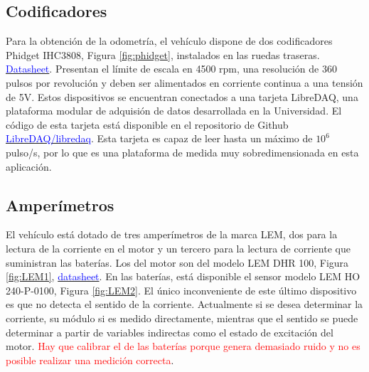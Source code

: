 \subsection{Codificadores}\label{Subsec:Codificadores}
Para la obtención de la odometría, el vehículo dispone de dos codificadores Phidget IHC3808, Figura \ref{fig:phidget}, instalados en las ruedas traseras. \href{https://github.com/ual-arm/ual-ecar-docs/blob/master/Datasheet/Encoder-Phidget-IHC3808.pdf}{\textcolor{blue}{Datasheet}}. Presentan el límite de escala en 4500 rpm, una resolución de 360 pulsos por revolución y deben ser alimentados en corriente continua a una tensión de 5V. Estos dispositivos se encuentran conectados a una tarjeta LibreDAQ, una plataforma modular de adquisión de datos desarrollada en la Universidad\cite{blanco2015LibreDaq}. El código de esta tarjeta está disponible en el repositorio de Github \href{https://github.com/LibreDAQ/libredaq}{\textcolor{blue}{LibreDAQ/libredaq}}. Esta tarjeta es capaz de leer hasta un máximo de $10^{6}$ pulso/s, por lo que es una plataforma de medida muy sobredimensionada en esta aplicación.

\subsection{Amperímetros}
El vehículo está dotado de tres amperímetros de la marca LEM, dos para la lectura de la corriente en el motor y un tercero para la lectura de corriente que suministran las baterías. Los del motor son del modelo LEM DHR 100, Figura \ref{fig:LEM1}, \href{https://github.com/ual-arm/ual-ecar-docs/blob/master/Datasheet/LEM_DHR_100.pdf}{\textcolor{blue}{datasheet}}. En las baterías, está disponible el sensor modelo LEM HO 240-P-0100, Figura \ref{fig:LEM2}. El único inconveniente de este último dispositivo es que no detecta el sentido de la corriente. Actualmente si se desea determinar la corriente, su módulo si es medido directamente, mientras que el sentido se puede determinar a partir de variables indirectas como el estado de excitación del motor. \textcolor{red}{Hay que calibrar el de las baterías porque genera demasiado ruido y no es posible realizar una medición correcta}.

